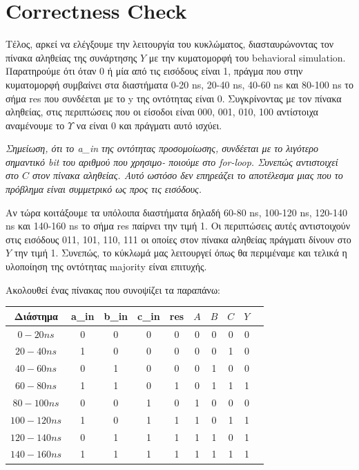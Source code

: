 \documentclass[]{article}
\begin{document}
\section{Correctness Check}
Τέλος, αρκεί να ελέγξουμε την λειτουργία του κυκλώματος, διασταυρώνοντας τον πίνακα αληθείας της συνάρτησης $Y$ με την κυματομορφή του behavioral simulation.
Παρατηρούμε ότι όταν 0 ή μία από τις εισόδους είναι 1, πράγμα που στην κυματομορφή συμβαίνει στα διαστήματα 0-20 ns, 20-40 ns, 40-60 ns και 80-100 ns το σήμα res που συνδέεται με το y της οντότητας είναι 0.
Συγκρίνοντας με τον πίνακα αληθείας, στις περιπτώσεις που οι είσοδοι είναι 000, 001, 010, 100 αντίστοιχα αναμένουμε το $Υ$ να είναι 0 και πράγματι αυτό ισχύει.

\textit{Σημείωση, ότι το a\_in της οντότητας προσομοίωσης, συνδέεται με το λιγότερο σημαντικό bit του αριθμού που χρησιμο- ποιούμε στο for-loop.
	Συνεπώς αντιστοιχεί στο $C$ στον πίνακα αληθείας. Αυτό ωστόσο δεν επηρεάζει το αποτέλεσμα μιας που το πρόβλημα είναι συμμετρικό ως προς τις εισόδους.}

Αν τώρα κοιτάξουμε τα υπόλοιπα διαστήματα δηλαδή 60-80 ns, 100-120 ns, 120-140 ns και 140-160 ns το σήμα res παίρνει την τιμή 1.
Οι περιπτώσεις αυτές αντιστοιχούν στις εισόδους 011, 101, 110, 111 οι οποίες στον πίνακα αληθείας πράγματι δίνουν στο $Y$ την τιμή 1.
Συνεπώς, το κύκλωμά μας λειτουργεί όπως θα περιμέναμε και τελικά η υλοποίηση της οντότητας majority είναι επιτυχής.

Ακολουθεί ένας πίνακας που συνοψίζει τα παραπάνω:
\begin{center}
	\begin{tabular}{|c|c|c|c|c|c|c|c|c|c}
		\hline Διάστημα  & a\_in & b\_in & c\_in & res & $A$ & $B$ & $C$ & $Y$ \\
		\hline $0-20 ns$ & 0     & 0     & 0     & 0   & 0   & 0   & 0   & 0   \\
		$20-40 ns$       & 1     & 0     & 0     & 0   & 0   & 0   & 1   & 0   \\
		$40-60 ns$       & 0     & 1     & 0     & 0   & 0   & 1   & 0   & 0   \\
		$60-80 ns$       & 1     & 1     & 0     & 1   & 0   & 1   & 1   & 1   \\
		$80-100 ns$      & 0     & 0     & 1     & 0   & 1   & 0   & 0   & 0   \\
		$100-120 ns$     & 1     & 0     & 1     & 1   & 1   & 0   & 1   & 1   \\
		$120-140 ns$     & 0     & 1     & 1     & 1   & 1   & 1   & 0   & 1   \\
		$140-160 ns$     & 1     & 1     & 1     & 1   & 1   & 1   & 1   & 1   \\
		\hline
	\end{tabular}
\end{center}
\end{document}
